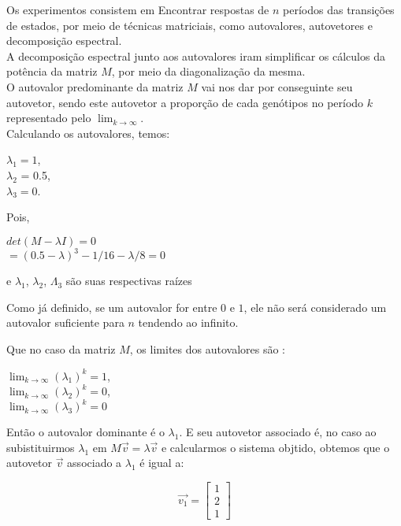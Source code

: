 \documentclass[14pt]{article}
\begin{document}
Os experimentos consistem em Encontrar respostas de $n$ períodos das transições de estados, por meio de técnicas matriciais, como autovalores, autovetores e decomposição espectral.\\

A decomposição espectral junto aos autovalores iram simplificar os cálculos da potência da matriz $M$, por meio da diagonalização da mesma. \\

O autovalor predominante da matriz $M$ vai nos dar por conseguinte seu autovetor, sendo este autovetor a proporção de cada genótipos no período $k$ representado pelo $\lim_{k\to\infty}$.\\

Calculando os autovalores, temos:
\begin{center}
    $\lambda_1 = 1$,\\ $\lambda_2$ = 0.5,\\ $\lambda_3 = 0$.
\end{center}

Pois,
\begin{center}
    $det(M-\lambda I) = 0$\\
    $= (0.5 - \lambda)^3 - 1/16 - \lambda/8 = 0$
\end{center}
e $\lambda_1$, $\lambda_2$, $\Lambda_3$ são suas respectivas raízes

Como já definido, se um autovalor for entre $0$ e $1$, ele não será considerado um autovalor suficiente para $n$ tendendo ao infinito.

Que no caso da matriz $M$, os limites dos autovalores são :
\begin{center}
    $\lim_{k\to\infty} (\lambda_1)^k = 1$,\\
    $\lim_{k\to\infty} (\lambda_2)^k = 0$,\\
    $\lim_{k\to\infty} (\lambda_3)^k = 0$
\end{center}

Então o autovalor dominante é o $\lambda_1$. E seu autovetor associado é, no caso ao subistituirmos $\lambda_1$ em $M\vec{v} = \lambda \vec{v}$ e calcularmos o sistema objtido, obtemos que o autovetor $\vec{v}$ associado a $\lambda_1$ é igual a:

\begin{displaymath}
\vec{v_1} = \begin{bmatrix}
1\\
2\\
1
\end{bmatrix}
\end{displaymath}
\end{document}
